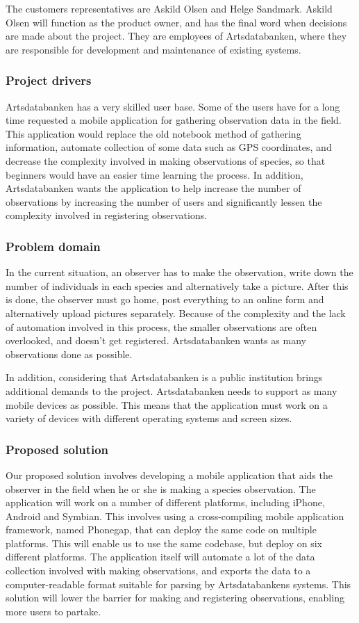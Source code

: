 The customers representatives are Askild Olsen and Helge Sandmark. Askild Olsen
will function as the product owner, and has the final word when decisions are
made about the project. They are employees of Artsdatabanken, where they are
responsible for development and maintenance of existing systems.

\subsubsection{Project drivers}
Artsdatabanken has a very skilled user base. Some of the users have for a long
time requested a mobile application for gathering observation data in the
field. This application would replace the old notebook method of gathering
information, automate collection of some data such as GPS coordinates, and
decrease the complexity involved in making observations of species, so that
beginners would have an easier time learning the process. In addition,
Artsdatabanken wants the application to help increase the number of
observations by increasing the number of users and significantly lessen the
complexity involved in registering observations.

\subsubsection{Problem domain}
In the current situation, an observer has to make the observation, write down
the number of individuals in each species and alternatively take a picture. After this is done,
the observer must go home, post everything to an online form and
alternatively upload pictures separately. Because of the complexity and the
lack of automation involved in this process, the smaller observations are often
overlooked, and doesn't get registered. Artsdatabanken wants as many
observations done as possible.

In addition, considering that Artsdatabanken is a public institution brings
additional demands to the project. Artsdatabanken needs to support as many
mobile devices as possible. This means that the application must work on
a variety of devices with different operating systems and screen sizes.

\subsubsection{Proposed solution}
Our proposed solution involves developing a mobile application that aids the
observer in the field when he or she is making a species observation. The
application will work on a number of different platforms, including iPhone,
Android and Symbian. This involves using a cross-compiling mobile application
framework, named Phonegap, that can deploy the same code on multiple platforms.
This will enable us to use the same codebase, but deploy on six different
platforms. The application itself will automate a lot of the data collection
involved with making observations, and exports the data to a computer-readable
format suitable for parsing by Artsdatabankens systems. This solution will
lower the barrier for making and registering observations, enabling more users
to partake.

